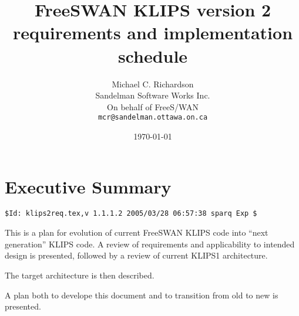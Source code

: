 \documentclass[titlepage]{article}
\author{Michael C. Richardson\\
	Sandelman Software Works Inc.\\
	On behalf of FreeS/WAN\\
	{\tt mcr@sandelman.ottawa.on.ca}}
\date{\today}
\title{FreeSWAN KLIPS version 2 requirements and implementation schedule}
\begin{document}
\maketitle\newpage

\section{Executive Summary}

\begin{verbatim}
$Id: klips2req.tex,v 1.1.1.2 2005/03/28 06:57:38 sparq Exp $
\end{verbatim}

This is a plan for evolution of current FreeSWAN KLIPS code into ``next
generation'' KLIPS code. A review of requirements and applicability to
intended design is presented, followed by a review of current KLIPS1
architecture.

The target architecture is then described.

A plan both to develope this document and to transition from old to new is
presented.









\end{document}
